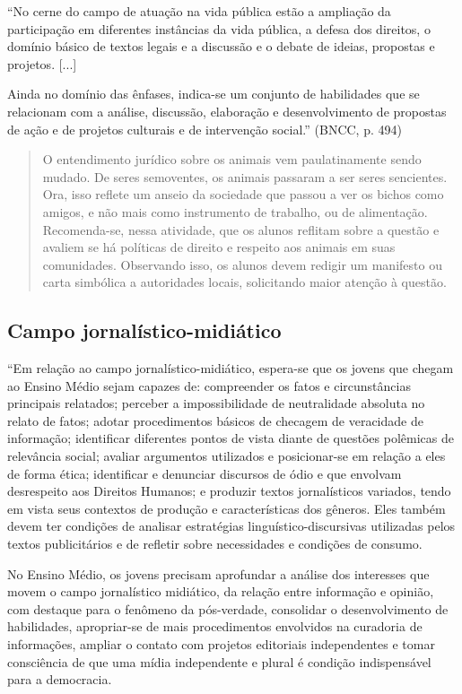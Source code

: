 \documentclass[12pt]{extarticle}
\begin{document}
``No cerne do campo de atuação na vida pública estão a ampliação da
participação em diferentes instâncias da vida pública, a defesa dos
direitos, o domínio básico de textos legais e a discussão e o debate de
ideias, propostas e projetos. {[}...{]}

Ainda no domínio das ênfases, indica-se um conjunto de habilidades que
se relacionam com a análise, discussão, elaboração e desenvolvimento de
propostas de ação e de projetos culturais e de intervenção social.''
(BNCC, p. 494)

\begin{quote}
O entendimento jurídico sobre os animais vem paulatinamente sendo
mudado. De seres semoventes, os animais passaram a ser seres sencientes.
Ora, isso reflete um anseio da sociedade que passou a ver os bichos como
amigos, e não mais como instrumento de trabalho, ou de alimentação.
Recomenda-se, nessa atividade, que os alunos reflitam sobre a questão e
avaliem se há políticas de direito e respeito aos animais em suas
comunidades. Observando isso, os alunos devem redigir um manifesto ou
carta simbólica a autoridades locais, solicitando maior atenção à
questão.
\end{quote}

\subsection{Campo jornalístico-midiático }

``Em relação ao campo jornalístico-midiático, espera-se que os jovens
que chegam ao Ensino Médio sejam capazes de: compreender os fatos e
circunstâncias principais relatados; perceber a impossibilidade de
neutralidade absoluta no relato de fatos; adotar procedimentos básicos
de checagem de veracidade de informação; identificar diferentes pontos
de vista diante de questões polêmicas de relevância social; avaliar
argumentos utilizados e posicionar-se em relação a eles de forma ética;
identificar e denunciar discursos de ódio e que envolvam desrespeito aos
Direitos Humanos; e produzir textos jornalísticos variados, tendo em
vista seus contextos de produção e características dos gêneros. Eles
também devem ter condições de analisar estratégias
linguístico-discursivas utilizadas pelos textos publicitários e de
refletir sobre necessidades e condições de consumo.

No Ensino Médio, os jovens precisam aprofundar a análise dos interesses
que movem o campo jornalístico midiático, da relação entre informação e
opinião, com destaque para o fenômeno da pós-verdade, consolidar o
desenvolvimento de habilidades, apropriar-se de mais procedimentos
envolvidos na curadoria de informações, ampliar o contato com projetos
editoriais independentes e tomar consciência de que uma mídia
independente e plural é condição indispensável para a democracia.
\end{document}
